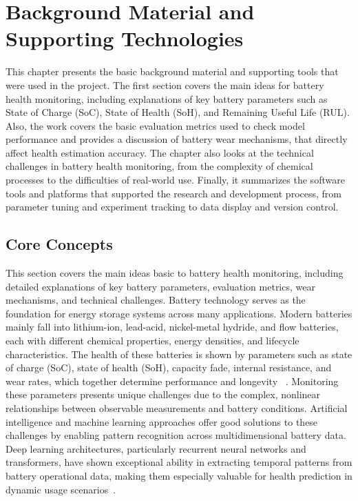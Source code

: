 \chapter{Background Material and Supporting Technologies}
\label{ch:background}

This chapter presents the basic background material and supporting tools that were used in the project. The first section covers the main ideas for battery health monitoring, including explanations of key battery parameters such as State of Charge (SoC), State of Health (SoH), and Remaining Useful Life (RUL). Also, the work covers the basic evaluation metrics used to check model performance and provides a discussion of battery wear mechanisms, that directly affect health estimation accuracy. The chapter also looks at the technical challenges in battery health monitoring, from the complexity of chemical processes to the difficulties of real-world use. Finally, it summarizes the software tools and platforms that supported the research and development process, from parameter tuning and experiment tracking to data display and version control.

\section{Core Concepts}

This section covers the main ideas basic to battery health monitoring, including detailed explanations of key battery parameters, evaluation metrics, wear mechanisms, and technical challenges. Battery technology serves as the foundation for energy storage systems across many applications. Modern batteries mainly fall into lithium-ion, lead-acid, nickel-metal hydride, and flow batteries, each with different chemical properties, energy densities, and lifecycle characteristics. The health of these batteries is shown by parameters such as state of charge (SoC), state of health (SoH), capacity fade, internal resistance, and wear rates, which together determine performance and longevity ~\cite{vijaychandra_comprehensive_2024}. Monitoring these parameters presents unique challenges due to the complex, nonlinear relationships between observable measurements and battery conditions. Artificial intelligence and machine learning approaches offer good solutions to these challenges by enabling pattern recognition across multidimensional battery data. Deep learning architectures, particularly recurrent neural networks and transformers, have shown exceptional ability in extracting temporal patterns from battery operational data, making them especially valuable for health prediction in dynamic usage scenarios~\cite{renold_comprehensive_2024}. 

